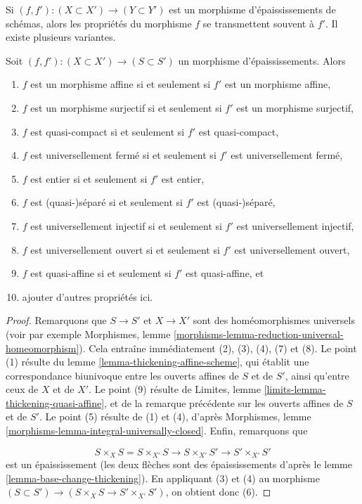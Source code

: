 \noindent
Si $(f, f') : (X \subset X') \to (Y \subset Y')$ est un morphisme
d'épaississements de schémas, alors les propriétés du morphisme
$f$ se transmettent souvent à $f'$. Il existe plusieurs variantes.

\begin{lemma}
\label{lemma-thicken-property-morphisms}
Soit $(f, f') : (X \subset X') \to (S \subset S')$ un morphisme
d'épaississements. Alors
\begin{enumerate}
\item $f$ est un morphisme affine si et seulement si $f'$ est un morphisme affine,
\item $f$ est un morphisme surjectif si et seulement si $f'$ est un morphisme surjectif,
\item $f$ est quasi-compact si et seulement si $f'$ est quasi-compact,
\item $f$ est universellement fermé si et seulement si $f'$ est universellement fermé,
\item $f$ est entier si et seulement si $f'$ est entier,
\item $f$ est (quasi-)séparé si et seulement si $f'$ est (quasi-)séparé,
\item $f$ est universellement injectif si et seulement si $f'$ est universellement injectif,
\item $f$ est universellement ouvert si et seulement si $f'$ est universellement ouvert,
\item $f$ est quasi-affine si et seulement si $f'$ est quasi-affine, et
\item ajouter d'autres propriétés ici.
\end{enumerate}
\end{lemma}

\begin{proof}
Remarquons que $S \to S'$ et $X \to X'$ sont des homéomorphismes universels
(voir par exemple
Morphismes, lemme \ref{morphisms-lemma-reduction-universal-homeomorphism}).
Cela entraîne immédiatement (2), (3), (4), (7) et (8).
Le point (1) résulte du lemme \ref{lemma-thickening-affine-scheme},
qui établit une correspondance biunivoque entre
les ouverts affines de $S$ et de $S'$, ainsi qu'entre ceux de $X$ et de $X'$.
Le point (9) résulte de
Limites, lemme \ref{limits-lemma-thickening-quasi-affine},
et de la remarque précédente sur les ouverts affines de $S$ et de $S'$.
Le point (5) résulte de (1) et (4), d'après
Morphismes, lemme \ref{morphisms-lemma-integral-universally-closed}.
Enfin, remarquons que

$$
S \times_X S = S \times_{X'} S \to S \times_{X'} S' \to S' \times_{X'} S'
$$
est un épaississement (les deux flèches sont des épaississements d'après
le lemme \ref{lemma-base-change-thickening}).
En appliquant (3) et (4) au morphisme
$(S \subset S') \to (S \times_X S \to S' \times_{X'} S')$,
on obtient donc (6).
\end{proof}

